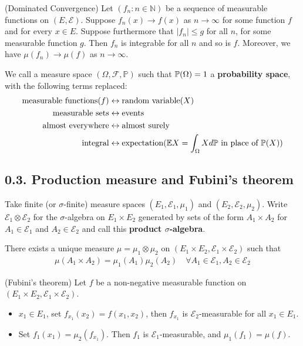 \documentclass[12pt,a4paper]{report}
\begin{document}
(Dominated Convergence) Let $(f_n :n \in \mathbb{N})$ be a sequence of measurable functions on $(E,\mathscr{E})$. Suppose $f_n(x) \rightarrow f(x)$ as $n\rightarrow\infty$ for some function $f$ and for every $x\in E$. Suppose furthermore that $|f_n| \leq g$ for all $n$, for some measurable function $g$. Then $f_n$ is integrable for all $n$ and so is $f$. Moreover, we have $\mu(f_n) \rightarrow \mu(f)$ as $n\rightarrow \infty$.
\s

We call a measure space $(\Omega, \mathscr{F}, \mathbb{P})$ such that $\mathbb{P}(\Omega) =1$ a \textbf{probability space}, with the following terms replaced:
\begin{align*}
\text{measurable functions} (f) &\leftrightarrow \text{random variable} (X) \\
\text{measurable sets} &\leftrightarrow \text{events} \\
\text{almost everywhere} &\leftrightarrow \text{almost surely}\\
\text{integral} & \leftrightarrow \text{expectation}(\mathbb{E}{X} = \int_{\Omega} X d\mathbb{P} \text{ in place of } \mathbb{P}(X))
\end{align*}

\subsection*{0.3. Production measure and Fubini's theorem}

Take finite (or $\sigma$-finite) measure spaces $(E_1, \mathscr{E}_1, \mu_1)$ and $(E_2, \mathscr{E}_2, \mu_2)$. Write $\mathscr{E}_1 \otimes \mathscr{E}_2$ for the $\sigma$-algebra on $E_1 \times E_2$ generated by sets of the form $A_1 \times A_2$ for $A_1 \in \mathscr{E}_1$ and $A_2 \in \mathscr{E}_2$ and call this \textbf{product $\sigma$-algebra}.
\s

 There exists a unique measure $\mu = \mu_1 \otimes \mu_2$ on $(E_1 \times E_2, \mathscr{E}_1 \times \mathscr{E}_2)$ such that
\begin{align*}
\mu(A_1 \times A_2) = \mu_1(A_1) \mu_2(A_2) \quad \forall A_1 \in \mathscr{E}_1, A_2 \in \mathscr{E}_2
\end{align*}
\s

 (Fubini's theorem) Let $f$ be a non-negative measurable function on $(E_1 \times E_2, \mathscr{E}_1 \times \mathscr{E}_2)$.

\begin{itemize}
\item $x_1 \in E_1$, set $f_{x_1} (x_2) = f(x_1, x_2)$, then $f_{x_1}$ is $\mathscr{E_2}$-measurable for all $x_1 \in E_1$.

\item Set $f_1(x_1) = \mu_2(f_{x_1})$. Then $f_1$ is $\mathscr{E}_1$-measurable, and $\mu_1(f_1) = \mu(f)$.
\end{itemize} 
\eos
\end{document}
